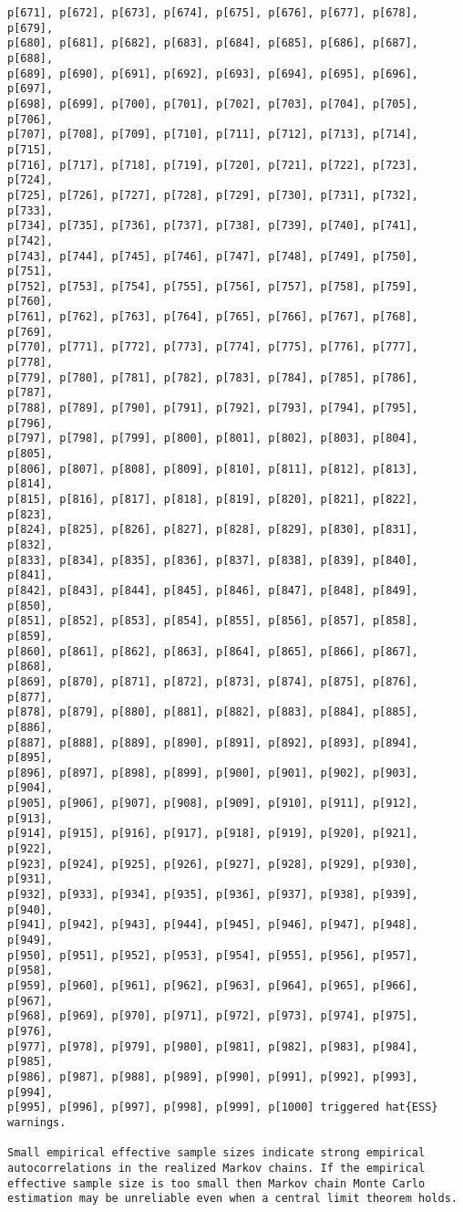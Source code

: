 \documentclass[
  letterpaper,
  DIV=11,
  numbers=noendperiod]{scrartcl}
\begin{document}
\begin{verbatim}
p[671], p[672], p[673], p[674], p[675], p[676], p[677], p[678], p[679],
p[680], p[681], p[682], p[683], p[684], p[685], p[686], p[687], p[688],
p[689], p[690], p[691], p[692], p[693], p[694], p[695], p[696], p[697],
p[698], p[699], p[700], p[701], p[702], p[703], p[704], p[705], p[706],
p[707], p[708], p[709], p[710], p[711], p[712], p[713], p[714], p[715],
p[716], p[717], p[718], p[719], p[720], p[721], p[722], p[723], p[724],
p[725], p[726], p[727], p[728], p[729], p[730], p[731], p[732], p[733],
p[734], p[735], p[736], p[737], p[738], p[739], p[740], p[741], p[742],
p[743], p[744], p[745], p[746], p[747], p[748], p[749], p[750], p[751],
p[752], p[753], p[754], p[755], p[756], p[757], p[758], p[759], p[760],
p[761], p[762], p[763], p[764], p[765], p[766], p[767], p[768], p[769],
p[770], p[771], p[772], p[773], p[774], p[775], p[776], p[777], p[778],
p[779], p[780], p[781], p[782], p[783], p[784], p[785], p[786], p[787],
p[788], p[789], p[790], p[791], p[792], p[793], p[794], p[795], p[796],
p[797], p[798], p[799], p[800], p[801], p[802], p[803], p[804], p[805],
p[806], p[807], p[808], p[809], p[810], p[811], p[812], p[813], p[814],
p[815], p[816], p[817], p[818], p[819], p[820], p[821], p[822], p[823],
p[824], p[825], p[826], p[827], p[828], p[829], p[830], p[831], p[832],
p[833], p[834], p[835], p[836], p[837], p[838], p[839], p[840], p[841],
p[842], p[843], p[844], p[845], p[846], p[847], p[848], p[849], p[850],
p[851], p[852], p[853], p[854], p[855], p[856], p[857], p[858], p[859],
p[860], p[861], p[862], p[863], p[864], p[865], p[866], p[867], p[868],
p[869], p[870], p[871], p[872], p[873], p[874], p[875], p[876], p[877],
p[878], p[879], p[880], p[881], p[882], p[883], p[884], p[885], p[886],
p[887], p[888], p[889], p[890], p[891], p[892], p[893], p[894], p[895],
p[896], p[897], p[898], p[899], p[900], p[901], p[902], p[903], p[904],
p[905], p[906], p[907], p[908], p[909], p[910], p[911], p[912], p[913],
p[914], p[915], p[916], p[917], p[918], p[919], p[920], p[921], p[922],
p[923], p[924], p[925], p[926], p[927], p[928], p[929], p[930], p[931],
p[932], p[933], p[934], p[935], p[936], p[937], p[938], p[939], p[940],
p[941], p[942], p[943], p[944], p[945], p[946], p[947], p[948], p[949],
p[950], p[951], p[952], p[953], p[954], p[955], p[956], p[957], p[958],
p[959], p[960], p[961], p[962], p[963], p[964], p[965], p[966], p[967],
p[968], p[969], p[970], p[971], p[972], p[973], p[974], p[975], p[976],
p[977], p[978], p[979], p[980], p[981], p[982], p[983], p[984], p[985],
p[986], p[987], p[988], p[989], p[990], p[991], p[992], p[993], p[994],
p[995], p[996], p[997], p[998], p[999], p[1000] triggered hat{ESS}
warnings.

Small empirical effective sample sizes indicate strong empirical
autocorrelations in the realized Markov chains. If the empirical
effective sample size is too small then Markov chain Monte Carlo
estimation may be unreliable even when a central limit theorem holds.
\end{verbatim}
\end{document}
